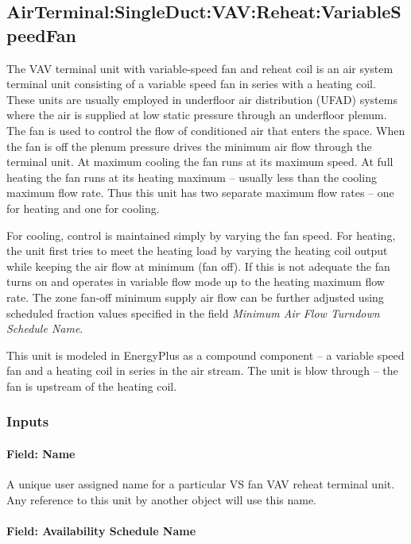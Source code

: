 \subsection{AirTerminal:SingleDuct:VAV:Reheat:VariableSpeedFan}\label{airterminalsingleductvavreheatvariablespeedfan}

The VAV terminal unit with variable-speed fan and reheat coil is an air system terminal unit consisting of a variable speed fan in series with a heating coil. These units are usually employed in underfloor air distribution (UFAD) systems where the air is supplied at low static pressure through an underfloor plenum. The fan is used to control the flow of conditioned air that enters the space. When the fan is off the plenum pressure drives the minimum air flow through the terminal unit. At maximum cooling the fan runs at its maximum speed. At full heating the fan runs at its heating maximum -- usually less than the cooling maximum flow rate. Thus this unit has two separate maximum flow rates -- one for heating and one for cooling.

For cooling, control is maintained simply by varying the fan speed. For heating, the unit first tries to meet the heating load by varying the heating coil output while keeping the air flow at minimum (fan off). If this is not adequate the fan turns on and operates in variable flow mode up to the heating maximum flow rate. The zone fan-off minimum supply air flow can be further adjusted using scheduled fraction values specified in the field \textit{Minimum Air Flow Turndown Schedule Name}.

This unit is modeled in EnergyPlus as a compound component -- a variable speed fan and a heating coil in series in the air stream. The unit is blow through -- the fan is upstream of the heating coil.

\subsubsection{Inputs}\label{inputs-3-000}

\paragraph{Field: Name}\label{field-name-3-000}

A unique user assigned name for a particular VS fan VAV reheat terminal unit. Any reference to this unit by another object will use this name.

\paragraph{Field: Availability Schedule Name}\label{field-availability-schedule-name-3}

